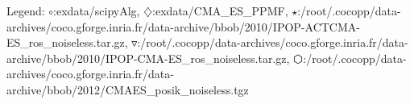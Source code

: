 Legend: {\color{NavyBlue}$\circ$}:exdata/scipyAlg, {\color{Magenta}$\diamondsuit$}:exdata/CMA\_ES\_PPMF, {\color{Orange}$\star$}:/root/.cocopp/data-archives/coco.gforge.inria.fr/data-archive/bbob/2010/IPOP-ACTCMA-ES\_ros\_noiseless.tar.gz, {\color{CornflowerBlue}$\triangledown$}:/root/.cocopp/data-archives/coco.gforge.inria.fr/data-archive/bbob/2010/IPOP-CMA-ES\_ros\_noiseless.tar.gz, {\color{red}$\varhexagon$}:/root/.cocopp/data-archives/coco.gforge.inria.fr/data-archive/bbob/2012/CMAES\_posik\_noiseless.tgz